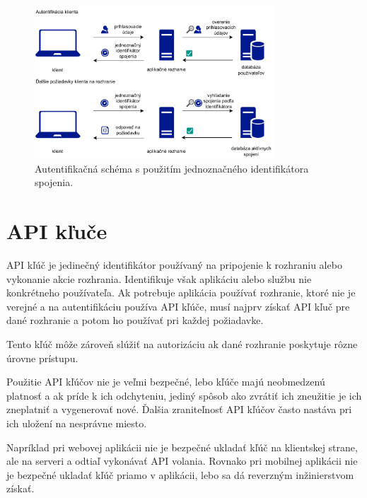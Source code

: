 \begin{figure}
    \centerline{\includegraphics[width=0.8\textwidth]{images/session_schema}}
    \caption[Autentifikačná schéma s použitím jednoznačného identifikátora spojenia]{Autentifikačná schéma s použitím jednoznačného identifikátora spojenia.}
    \label{obr:session}
\end{figure}

\section{API kľuče}

API kľúč je jedinečný identifikátor používaný na pripojenie k rozhraniu alebo vykonanie akcie rozhrania. Identifikuje však aplikáciu alebo službu nie konkrétneho používateľa. Ak potrebuje aplikácia používať rozhranie, ktoré nie je verejné a na autentifikáciu používa API kľúče, musí najprv získať API kľuč pre dané rozhranie a potom ho používať pri každej požiadavke.

Tento kľúč môže zároveň slúžiť na autorizáciu ak dané rozhranie poskytuje rôzne úrovne prístupu.

Použitie API kľúčov nie je veľmi bezpečné, lebo kľúče majú neobmedzenú platnosť a ak príde k ich odchyteniu, jediný spôsob ako zvrátiť ich zneužitie je ich zneplatniť a vygenerovať nové. Ďalšia zraniteľnosť API kľúčov často nastáva pri ich uložení na nesprávne miesto.

Napríklad pri webovej aplikácii nie je bezpečné ukladať kľúč na klientskej strane, ale na serveri a odtiaľ vykonávať API volania. Rovnako pri mobilnej aplikácii nie je bezpečné ukladať kľúč priamo v aplikácii, lebo sa dá reverzným inžinierstvom získať. \cite{api_key_vulnerabilities}

